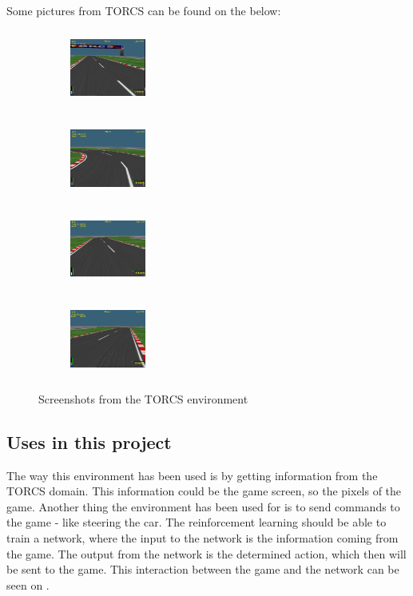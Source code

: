 Some pictures from TORCS can be found on  the below:
\begin{figure} [H]
	\centering
	\begin{subfigure}{.20\textwidth}
		\centering
		\includegraphics[width=25mm, height=25mm]{Figures/Architecture/Torcs/torcs_2.png}
	\end{subfigure}
	\begin{subfigure}{.20\textwidth}
	\centering
	\includegraphics[width=25mm, height=25mm]{Figures/Architecture/Torcs/torcs_3.png}
    \end{subfigure}
	\begin{subfigure}{.20\textwidth}
	\centering
	\includegraphics[width=25mm, height=25mm]{Figures/Architecture/Torcs/torcs_4.png}
	\end{subfigure}
	\begin{subfigure}{.20\textwidth}
	\centering
	\includegraphics[width=25mm, height=25mm]{Figures/Architecture/Torcs/torcs_5.png}
	\end{subfigure}
	\caption{Screenshots from the TORCS environment}
	\label{fig:torcs_screenshots}
\end{figure}
      
\subsection{Uses in this project}      
The way this environment has been used is by getting information from the TORCS domain. This information could be the game screen, so the pixels of the game. Another thing the environment has been used for is to send commands to the game - like steering the car. 
The reinforcement learning should be able to train a network, where the input to the network is the information coming from the game. The output from the network is the determined action, which then will be sent to the game. This interaction between the game and the network can be seen on .   
 
